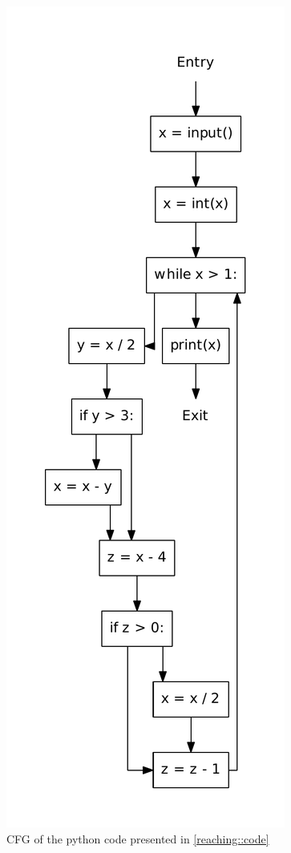 \begin{figure}
  \begin{center}
  \includegraphics[scale=.5]{./figures/reaching_definitions.pdf}
  \caption{CFG of the python code presented in \cref{reaching::code}}
  \label{reaching::cfg}
  \end{center}
\end{figure}

